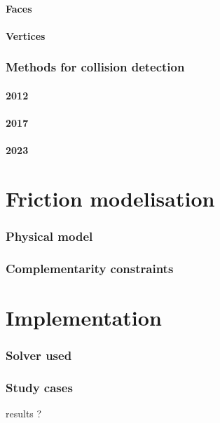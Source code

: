 \documentclass[a4paper]{article}
\begin{document}
	\subsection{Faces}
	\subsection{Vertices}
	
	\section{Methods for collision detection}
	\subsection{2012}
	\subsection{2017}
	\subsection{2023}
	
	
	
	
	\part{Friction modelisation}
	
	\section{Physical model}
	
	\section{Complementarity constraints}
	
	
	
	
	\part{Implementation}
	
	\section{Solver used}
	
	\section{Study cases}
	results ?
	
\end{document}
